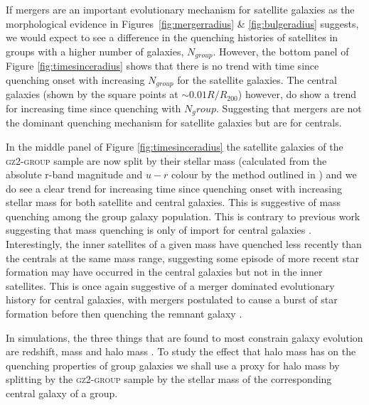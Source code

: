 \documentclass[useAMS,usenatbib]{mn2e}
\begin{document}
{If mergers are an important evolutionary mechanism for satellite galaxies as the morphological evidence in Figures~\ref{fig:mergerradius} \& \ref{fig:bulgeradius} suggests, we would expect to see a difference in the quenching histories of satellites in groups with a higher number of galaxies, $N_{group}$. However, the bottom panel of Figure \ref{fig:timesinceradius} shows that there is no trend with time since quenching onset with increasing $N_{group}$ for the satellite galaxies. The central galaxies (shown by the square points at $\sim 0.01 R/R_{200}$) however, do show a trend for increasing time since quenching with $N_group$. Suggesting that mergers are not the dominant quenching mechanism for satellite galaxies but are for centrals.  

In the middle panel of Figure \ref{fig:timesinceradius} the satellite galaxies of the \textsc{gz2-group} sample are now split by their stellar mass (calculated from the absolute r-band magnitude and $u-r$ colour by the method outlined in \citealt{baldry06}) and we do see a clear trend for increasing time since quenching onset with increasing stellar mass for both satellite and central galaxies. This is suggestive of mass quenching among the group galaxy population. This is contrary to previous work suggesting that mass quenching is only of import for central galaxies \citep{ref, ref, ref}. Interestingly, the inner satellites of a given mass have quenched less recently than the centrals at the same mass range, suggesting some episode of more recent star formation may have occurred in the central galaxies but not in the inner satellites. This is once again suggestive of a merger dominated evolutionary history for central galaxies, with mergers postulated to cause a burst of star formation before then quenching the remnant galaxy \citep{?,?, pontzen16}. 

In simulations, the three things that are found to most constrain galaxy evolution are redshift, mass and halo mass \cite{ref, ref}. To study the effect that halo mass has on the quenching properties of group galaxies we shall use a proxy for halo mass by splitting by the \textsc{gz2-group} sample by the stellar mass of the corresponding central galaxy of a group.

}
\end{document}
